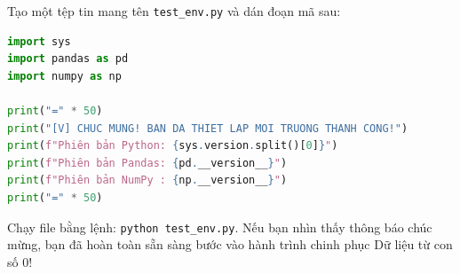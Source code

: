 Tạo một tệp tin mang tên \texttt{test\_env.py} và dán đoạn mã sau:
\begin{lstlisting}[language=Python]
import sys
import pandas as pd
import numpy as np

print("=" * 50)
print("[V] CHUC MUNG! BAN DA THIET LAP MOI TRUONG THANH CONG!")
print(f"Phiên bản Python: {sys.version.split()[0]}")
print(f"Phiên bản Pandas: {pd.__version__}")
print(f"Phiên bản NumPy : {np.__version__}")
print("=" * 50)
\end{lstlisting}

Chạy file bằng lệnh: \texttt{python test\_env.py}. Nếu bạn nhìn thấy thông báo chúc mừng, bạn đã hoàn toàn sẵn sàng bước vào hành trình chinh phục Dữ liệu từ con số 0!
